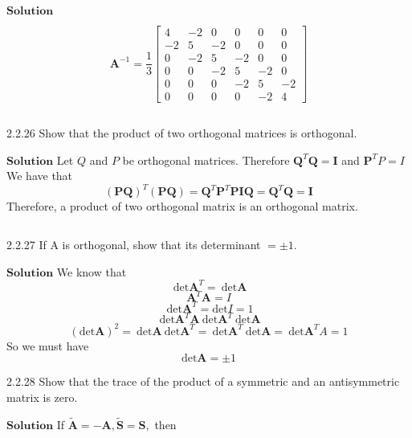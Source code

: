 $\boxed{\textbf{Solution}}$

$$\mathbf{A}^{-1}=\frac{1}{3}\begin{bmatrix}{4} & {-2} & {0} & {0} & {0} & {0} \\ {-2} & {5} & {-2} & {0} & {0} & {0} \\ {0} & {-2} & {5} & {-2} & {0} & {0} \\ {0} & {0} & {-2} & {5} & {-2} & {0} \\ {0} & {0} & {0} & {-2} & {5} & {-2} \\ {0} & {0} & {0} & {0} & {-2} & {4}\end{bmatrix}$$


$$$$

\begin{mybox}{2.2.26}
Show that the product of two orthogonal matrices is orthogonal.
\end{mybox}



$\boxed{\textbf{Solution}}$ Let $Q$ and $P$ be orthogonal matrices. Therefore $\mathbf{Q}^{T} \mathbf{Q}=\mathbf{I}$ and $\mathbf{P}^{T} P=I $
We have that
$$
(\mathbf{P Q})^{T}(\mathbf{P Q})=\mathbf{Q}^{T} \mathbf{P}^{T} \mathbf{P I Q}=\mathbf{Q}^{T} \mathbf{Q}=\mathbf{I}
$$
Therefore, a product of two orthogonal matrix is an orthogonal matrix.

$$$$




\begin{mybox}{2.2.27}
If A is orthogonal, show that its determinant $=\pm 1 .$
\end{mybox}



$\boxed{\textbf{Solution}}$ We know that
$$\ \text{det} \mathbf{A}^T = \ \text{det} \mathbf{A}$$
$$\mathbf{A}^T\mathbf{A}=I$$
$$\ \text{det} \mathbf{A}^T = \text{det}I = 1$$
$$\ \text{det} \mathbf{A}^T\mathbf{A} \ \text{det} \mathbf{A}^T \ \text{det} \mathbf{A}$$
$$(\text{det} \mathbf{A})^2 = \ \text{det} \mathbf{A} \ \text{det} \mathbf{A}^T = \ \text{det} \mathbf{A}^T \ \text{det} \mathbf{A} = \ \text{det} \mathbf{A}^TA = 1$$
So we must have
$$\text{det}\mathbf{A} = \pm 1$$





\begin{mybox}{2.2.28}
Show that the trace of the product of a symmetric and an antisymmetric matrix is zero.
\end{mybox}


$\boxed{\textbf{Solution}}$  
If $\tilde{\mathbf{A}}=-\mathbf{A}, \tilde{\mathbf{S}}=\mathbf{S},$ then

